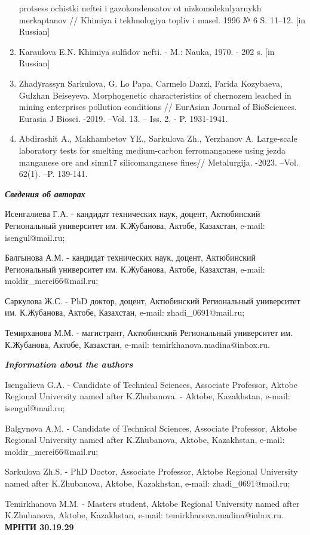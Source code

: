 \begin{enumerate}
  protsess ochistki neftei i gazokondensatov ot nizkomolekulyarnykh
  merkaptanov // Khimiya i tekhnologiya topliv i masel. 1996 № 6 S.
  11--12. {[}in Russian{]}
\item
  Karaulova E.N. Khimiya sul\textquotesingle fidov nefti. - M.: Nauka,
  1970. - 202 s. {[}in Russian{]}
\item
  Zhadуrassyn Sarkulova, G. Lo Papa, Carmelo Dazzi, Farida Kozybaeva,
  Gulzhan Beiseyeva. Morphogenetic characteristics of chernozem leached
  in mining enterprises pollution conditions // EurAsian Journal of
  BioSciences. Eurasia J Biosci. -2019. --Vol. 13. -- Iss. 2. - P.
  1931-1941.
\item
  Abdirashit A., Makhambetov YE., Sarkulova Zh., Yerzhanov A.
  Large-scale laboratory tests for smelting medium-carbon ferromanganese
  using jezda manganese ore and simn17 silicomanganese fines//
  Metalurgija. -2023. --Vol. 62(1). --P. 139-141.
\end{enumerate}

\emph{{\bfseries Сведения об авторах}}

Исенгалиева Г.А. - кандидат технических наук, доцент, Актюбинский
Региональный университет им. К.Жубанова, Актобе, Казахстан, e-mail:
isengul@mail.ru;

Балгынова А.М. - кандидат технических наук, доцент, Актюбинский
Региональный университет им. К.Жубанова, Актобе, Казахстан, e-mail:
moldir\_merei66@mail.ru;

Саркулова Ж.С. - PhD доктор, доцент, Актюбинский Региональный
университет им. К.Жубанова, Актобе, Казахстан, e-mail:
zhadi\_0691@mail.ru;

Темирханова М.М. - магистрант, Актюбинский Региональный университет им.
К.Жубанова, Актобе, Казахстан, e-mail: temirkhanova.madina@inbox.ru.

\emph{{\bfseries Information about the authors}}

Isengalieva G.A. - Candidate of Technical Sciences, Associate Professor,
Aktobe Regional University named after K.Zhubanova. - Aktobe,
Kazakhstan, e-mail: isengul@mail.ru;

Balgynova A.M. - Candidate of Technical Sciences, Associate Professor,
Aktobe Regional University named after K.Zhubanova, Aktobe, Kazakhstan,
e-mail: moldir\_merei66@mail.ru;

Sarkulova Zh.S. - PhD Doctor, Associate Professor, Aktobe Regional
University named after K.Zhubanova, Aktobe, Kazakhstan, e-mail:
zhadi\_0691@mail.ru;

Temirkhanova M.M. - Master\textquotesingle s student, Aktobe Regional
University named after K.Zhubanova, Aktobe, Kazakhstan, e-mail:
temirkhanova.madina@inbox.ru.\newpage
{\bfseries МРНТИ 30.19.29}

